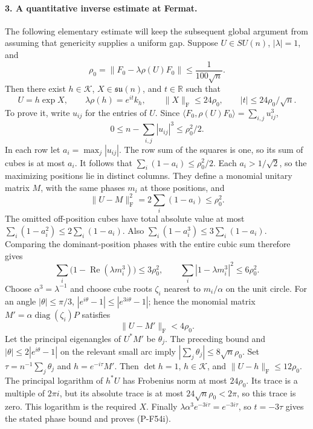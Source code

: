 \documentclass[11pt,a4paper]{article}
\begin{document}
\paragraph{3. A quantitative inverse estimate at Fermat.}
The following elementary estimate will keep the subsequent
global argument from assuming that genericity supplies a
uniform gap. Suppose $U\in SU(n)$, $|\lambda|=1$, and
\[
             \rho_0=\|F_0-\lambda\rho(U)F_0\|
                            \le\frac1{100\sqrt n}.
\]
Then there exist $h\in\mathcal K$, $X\in\mathfrak{su}(n)$,
and $t\in\mathbb R$ such that
\[
 U=h\exp X,\qquad \lambda\rho(h)=e^{it}k_h,
 \qquad \|X\|_{\mathrm F}\le24\rho_0,
 \qquad |t|\le24\rho_0/\sqrt n.                              \tag{P-F54i}
\]
To prove it, write $u_{ij}$ for the entries of $U$.
Since $\langle F_0,\rho(U)F_0\rangle=\sum_{i,j}u_{ij}^3$,
\[
 0\le n-\sum_{i,j}|u_{ij}|^3\le\rho_0^2/2.
\]
In each row let $a_i=\max_j|u_{ij}|$. The row sum of the
squares is one, so its sum of cubes is at most $a_i$.
It follows that $\sum_i(1-a_i)\le\rho_0^2/2$.
Each $a_i>1/\sqrt2$, so the maximizing positions lie in
distinct columns. They define a monomial unitary matrix
$M$, with the same phases $m_i$ at those positions, and
\[
                    \|U-M\|_{\mathrm F}^2
                       =2\sum_i(1-a_i)\le\rho_0^2.
\]
The omitted off-position cubes have total absolute value at
most $\sum_i(1-a_i^2)\le2\sum_i(1-a_i)$.
Also $\sum_i(1-a_i^3)\le3\sum_i(1-a_i)$.
Comparing the dominant-position phases with the entire cubic
sum therefore gives
\[
       \sum_i\bigl(1-\operatorname{Re}(\lambda m_i^3)\bigr)
                   \le3\rho_0^2,
       \qquad \sum_i|1-\lambda m_i^3|^2\le6\rho_0^2.
\]
Choose $\alpha^3=\lambda^{-1}$ and choose cube roots
$\zeta_i$ nearest to $m_i/\alpha$ on the unit circle.
For an angle $|\theta|\le\pi/3$,
$|e^{i\theta}-1|\le|e^{3i\theta}-1|$; hence the monomial
matrix $M'=\alpha\operatorname{diag}(\zeta_i)P$ satisfies
\[
                    \|U-M'\|_{\mathrm F}<4\rho_0.
\]
Let the principal eigenangles of $U^*M'$ be $\theta_j$.
The preceding bound and $|\theta|\le2|e^{i\theta}-1|$
on the relevant small arc imply
$|\sum_j\theta_j|\le8\sqrt n\rho_0$.
Set $\tau=n^{-1}\sum_j\theta_j$ and $h=e^{-i\tau}M'$.
Then $\det h=1$, $h\in\mathcal K$, and
$\|U-h\|_{\mathrm F}\le12\rho_0$.
The principal logarithm of $h^*U$ has Frobenius norm at
most $24\rho_0$. Its trace is a multiple of $2\pi i$,
but its absolute trace is at most
$24\sqrt n\rho_0<2\pi$, so this trace is zero.
This logarithm is the required $X$.
Finally $\lambda\alpha^3e^{-3i\tau}=e^{-3i\tau}$,
so $t=-3\tau$ gives the stated phase bound and proves
(P-F54i).
\end{document}
